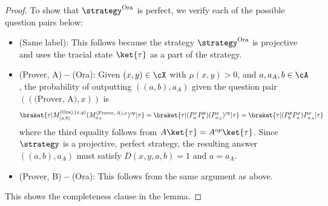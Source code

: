 \begin{proof}
To show that $\strategy^{\text{Ora}}$ is perfect, we verify each of the possible question pairs below:
\begin{itemize}
	\item (Same label): This follows because the strategy $\strategy^{\text{Ora}}$ is projective and uses the tracial state $\ket{\tau}$ as a part of the strategy. 
	\item (Prover, A) \textbf{--} (Ora): Given $(x,y) \in \cX$ with $\mu(x,y) > 0$, and $a, a_A, b \in \cA$, the probability of outputting $((a,b), a_A)$ given the question pair $((\text{(Prover, A)}, x))$ is
	\begin{align*}
		\braket{\tau|M_{(a,b)}^{\text{(Ora)}, (x,y)} (M_{a_A}^{\text{(Prover, A)}, x})^{op}|\tau} = \braket{\tau|( P^x_a P^y_b) (P^x_{a_A})^{op}|\tau} = \braket{\tau|(  P^y_b P^x_a) P^x_{a_A}|\tau}
	\end{align*}
	where the third equality follows from $A\ket{\tau} = A^{op} \ket{\tau}$. Since $\strategy$ is a projective, perfect strategy, the resulting answer $((a,b), a_A)$ must satisfy $D(x,y,a,b) = 1$ and $a = a_A$. 
	\item (Prover, B) \textbf{--} (Ora): This follows from the same argument as above. 
\end{itemize}
This shows the completeness clause in the lemma.


\end{proof}
